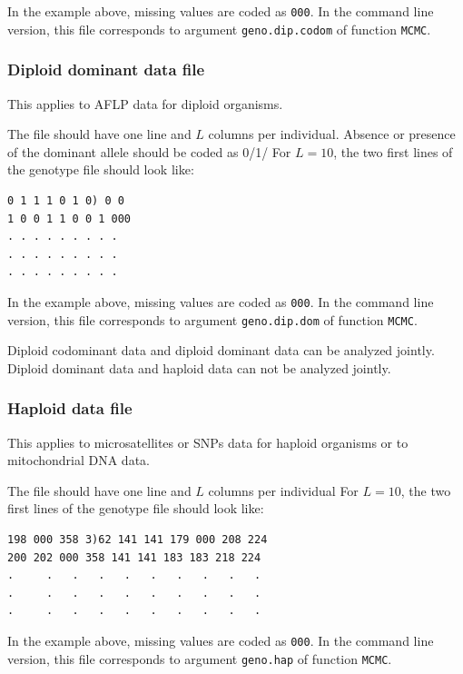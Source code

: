 \documentclass[a4paper,10pt]{article}
\begin{document}
In the example above, missing values are coded as {\tt 000}. 
In the command line version, this file corresponds to argument {\tt geno.dip.codom} of function {\tt MCMC}.

\subsubsection{Diploid dominant data file}

This applies to AFLP data for diploid organisms.

The file should have one line and $L$ columns per individual. 
Absence or presence of the dominant allele should be coded as 0/1/ 
For $L=10$, the two first lines of the genotype file should look like:\\

\medskip
\begin{verbatim}
0 1 1 1 0 1 0) 0 0
1 0 0 1 1 0 0 1 000
. . . . . . . . .
. . . . . . . . .
. . . . . . . . .
\end{verbatim}

In the example above, missing values are coded as {\tt 000}.
In the command line version, this file corresponds to argument {\tt geno.dip.dom} of function {\tt MCMC}.

Diploid codominant data and diploid dominant data can be analyzed jointly.
Diploid dominant data and haploid data can not be analyzed jointly.

\subsubsection{Haploid data file}

This applies to microsatellites or SNPs data for haploid organisms or to mitochondrial DNA data. 

The file should have one line and $L$ columns per individual
For $L=10$, the two first lines of the genotype file should look like:\\

\medskip
\begin{verbatim}
198 000 358 3)62 141 141 179 000 208 224 
200 202 000 358 141 141 183 183 218 224 
.     .   .   .   .   .   .   .   .   . 
.     .   .   .   .   .   .   .   .   . 
.     .   .   .   .   .   .   .   .   . 
\end{verbatim}


In the example above, missing values are coded as {\tt 000}.
In the command line version, this file corresponds to argument {\tt geno.hap} of function {\tt MCMC}.
\end{document}
